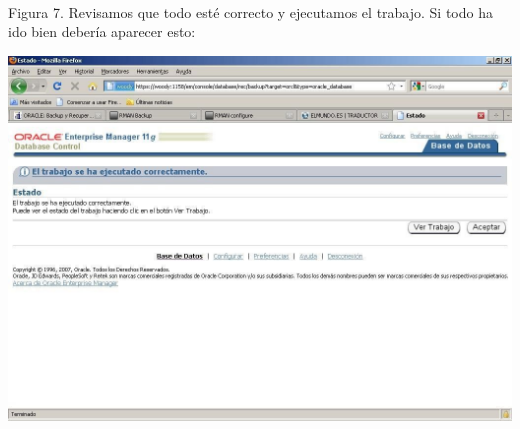 \begin{enumerate}[1.]
	\\Figura 7. Revisamos que todo esté correcto y ejecutamos el trabajo. Si todo ha ido bien debería aparecer esto:
	\begin{center}
	\includegraphics[width=15cm]{./Imagenes/img-4-2-7}  
	\end{center}




\end{enumerate}
